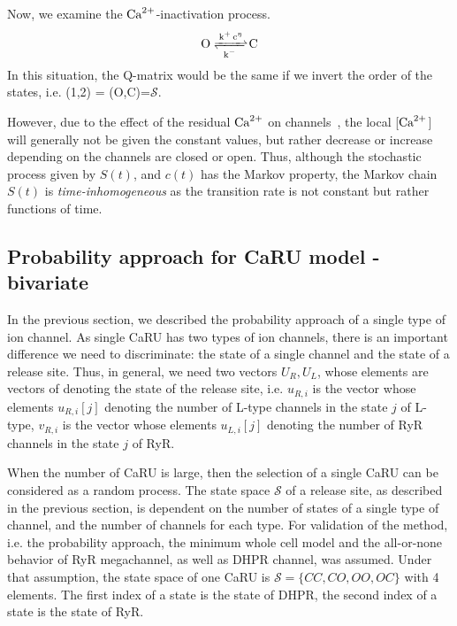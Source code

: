 Now, we examine the ${\text{Ca}^{2+}}$-inactivation process.
\begin{equation}
  \label{eq:193}
   \ce{O <=>[\ce{k^+ c^\eta}][k^-] C}
\end{equation}
In this situation, the Q-matrix would be the same if we invert the
order of the states, i.e. (1,2) = (O,C)=$\mathcal{S}$.





However, due to the effect of the residual ${\text{Ca}^{2+}}$ on
channels~\citep{mazzag2005erca}, the local [${\text{Ca}^{2+}}$] will generally
not be given the constant values, but rather decrease or increase
depending on the channels are closed or open. Thus, although the
stochastic process given by $S(t)$, and $c(t)$ has the Markov
property, the Markov chain $S(t)$ is {\it time-inhomogeneous} as the
transition rate is not constant but rather functions of time.

\subsection{Probability approach for CaRU model - bivariate}
\label{sec:prob-appr-caru-1}

In the previous section, we described the probability approach of a
single type of ion channel. As single CaRU has two types of ion
channels, there is an important difference we need to discriminate:
the state of a single channel and the state of a release site. Thus,
in general, we need two vectors $U_R, U_L$, whose elements are vectors
of denoting the state of the release site, i.e. $u_{R,i}$ is the
vector whose elements $u_{R,i}[j]$ denoting the number of L-type
channels in the state $j$ of L-type, $v_{R,i}$ is the vector whose
elements $u_{L,i}[j]$ denoting the number of RyR channels in the state
$j$ of RyR.

When the number of CaRU is large, then the selection of a single CaRU
can be considered as a random process. The state space $\mathcal{S}$
of a release site, as described in the previous section, is dependent
on the number of states of a single type of channel, and the number of
channels for each type. For validation of the method, i.e. the
probability approach, the minimum whole cell model and the all-or-none
behavior of RyR megachannel, as well as DHPR channel, was
assumed. Under that assumption, the state space of one CaRU is
$\mathcal{S} = \{CC, CO, OO, OC\}$ with 4 elements. The first index of
a state is the state of DHPR, the second index of a state is the state
of RyR.

